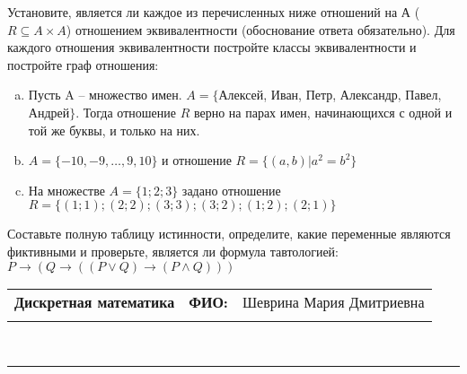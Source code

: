 \documentclass[10pt]{exam}
\newcommand{\class}{Дискретная математика}
\newcommand{\examdate}{}
\begin{document}
\begin{questions}
\question
Установите, является ли каждое из перечисленных ниже отношений на А ($R \subseteq A \times A$) отношением эквивалентности (обоснование ответа обязательно). Для каждого отношения эквивалентности постройте классы 
эквивалентности и постройте граф отношения:
\begin{enumerate} [a)]\setcounter{enumi}{0}
\item Пусть A – множество имен. $A = \{ $Алексей, Иван, Петр, Александр, Павел, Андрей$ \}$. Тогда отношение $R$ верно на парах имен, начинающихся с одной и той же буквы, и только на них.
\item $A = \{-10, -9, … , 9, 10\}$ и отношение $ R = \{(a,b)|a^{2} = b^{2}\}$
\item На множестве $A = \{1; 2; 3\}$ задано отношение $R = \{(1; 1); (2; 2); (3; 3); (3; 2); (1; 2); (2; 1)\}$
\end{enumerate}\question Составьте полную таблицу истинности, определите, какие переменные являются фиктивными и проверьте, является ли формула тавтологией:
$ P \rightarrow (Q \rightarrow ((P \lor Q) \rightarrow (P \land Q)))$

\end{questions}
\newpage
\begin{flushright}
\begin{tabular}{p{2.8in} r l}
\textbf{\class} & \textbf{ФИО:} &Шеврина Мария Дмитриевна
\\

\textbf{\examdate} &&\\
\end{tabular}\\
\end{flushright}
\rule[1ex]{\textwidth}{.1pt}
\end{document}
